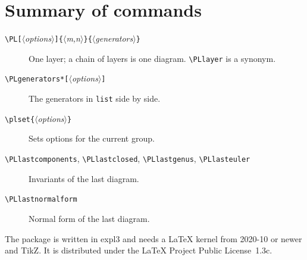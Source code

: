 \documentclass[11pt]{article}
\newcommand\opt[1]{\texttt{#1}}
\newcommand\cs[1]{\texttt{\textbackslash#1}}
\newcommand\meta[1]{\ensuremath{\langle}\textit{#1}\ensuremath{\rangle}}
\newcommand\marg[1]{\texttt{\{}\meta{#1}\texttt{\}}}
\newcommand\oarg[1]{\texttt{[}\meta{#1}\texttt{]}}
\begin{document}
\section{Summary of commands}

\begin{description}
  \item[\cs{PL}\oarg{options}\marg{m,n}\marg{generators}] One layer; a
    chain of layers is one diagram. \cs{PLlayer} is a synonym.
  \item[\cs{PLgenerators}\texttt{*}\oarg{options}] The generators in
    \opt{list} side by side.
  \item[\cs{plset}\marg{options}] Sets options for the current group.
  \item[\cs{PLlastcomponents}, \cs{PLlastclosed}, \cs{PLlastgenus},
    \cs{PLlasteuler}] Invariants of the last diagram.
  \item[\cs{PLlastnormalform}] Normal form of the last diagram.
\end{description}

The package is written in \textsf{expl3} and needs a \LaTeX{} kernel from
2020-10 or newer and TikZ. It is distributed under the \LaTeX{} Project
Public License~1.3c.
\end{document}
